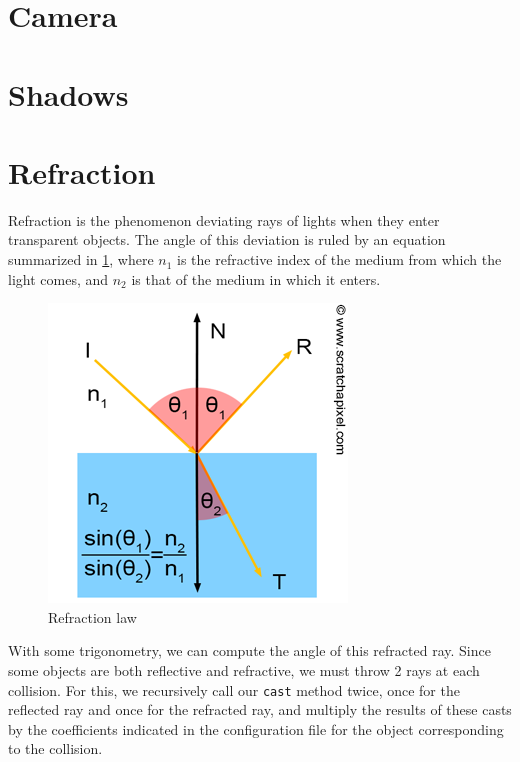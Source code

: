 \documentclass[a4paper,12pt,journal,twoside,compsoc]{PPIEEEtran}
\begin{document}
\section{Camera}

\section{Shadows}

\section{Refraction}

Refraction is the phenomenon deviating rays of lights when they enter
transparent objects.  The angle of this deviation is ruled by an equation
summarized in \cref{fig:refr}, where $n_1$ is the refractive index of the medium
from which the light comes, and $n_2$ is that of the medium in which it enters.
\begin{figure}
  \begin{center}
    \includegraphics[width=0.7\linewidth]{refraction.png}
  \end{center}
  \caption{Refraction law}
  \label{fig:refr}
\end{figure}

With some trigonometry, we can compute the angle of this refracted ray.  Since
some objects are both reflective and refractive, we must throw 2 rays at each
collision.  For this, we recursively call our \texttt{cast} method twice, once
for the reflected ray and once for the refracted ray, and multiply the results
of these casts by the coefficients indicated in the configuration file for the
object corresponding to the collision.
\end{document}
